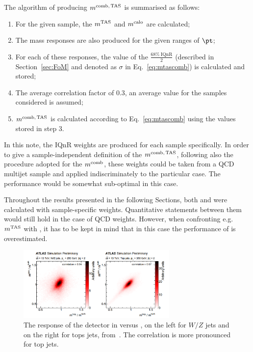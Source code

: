 The algorithm of producing $m^\textrm{comb,\,TAS}$ is summarised as follows:
\begin{enumerate}
 \item For the given sample, the $\mtas$ and $\mcal$ are calculated;
 \item The mass responses are also produced for the given ranges of $\pt$;
 \item For each of these responses, the value of the $\frac{68\% \: \textrm{IQnR}}{2}$ (described in Section~\ref{sec:FoM} and denoted as $\sigma$ in Eq.~\eqref{eq:mtascomb}) is calculated and stored;
 \item The average correlation factor of 0.3, an average value for the samples considered is assumed;
 \item $m^\textrm{comb,\,TAS}$ is calculated according to Eq.~\eqref{eq:mtascomb} using the values stored in step 3.
\end{enumerate}
In this note, the IQnR weights are produced for each sample specifically. In order to give a sample-independent definition of the $m^\textrm{comb,\,TAS}$, following also the procedure adopted for the $m^\textrm{comb}$, these weights could be taken from a QCD multijet sample and applied indiscriminately to the particular case. The performance would be somewhat sub-optimal in this case.

Throughout the results presented in the following Sections, both \mcomb and \mcombtas  were calculated with sample-specific weights. Quantitative statements between them would still hold in the case of QCD weights. However, when confronting e.g. $\mtas$ with \mcomb, it has to be kept in mind that in this case the performance of \mcomb is overestimated.

\begin{figure}[!ht]
  \centering
      \includegraphics[width=0.7\textwidth]{jet_part/mcomb/mcomb2.png}
  \caption[$\mcal$ and $\mtas$ correlation plots]{The response of the detector in \mtas versus \mcalo, on the left for $W/Z$ jets and on the right for tops jets, from~\cite{art35}. The correlation is more pronounced for top jets.}
  \label{fig:mcomb2}
\end{figure}



